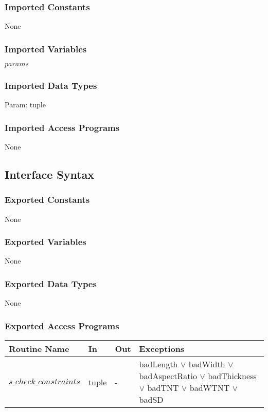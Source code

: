 \documentclass[12pt]{article}
\begin{document}
\subsubsection{Imported Constants}

None

\subsubsection{Imported Variables}

$params$

\subsubsection{Imported Data Types}

Param: tuple

\subsubsection{Imported Access Programs}

None

\subsection{Interface Syntax}

\subsubsection{Exported Constants}

None

\subsubsection{Exported Variables}

None

\subsubsection{Exported Data Types}

None

\subsubsection{Exported Access Programs}

\begin{center}
\begin{tabular}{l l l p{}}\hline 
\textbf{Routine Name} & \textbf{In} &\textbf{Out} & \textbf{Exceptions} \\ \hline 
$s\_check\_constraints$ & tuple & - & badLength $\vee$ badWidth $\vee$ badAspectRatio 
$\vee$ badThickness $\vee$ badTNT $\vee$ badWTNT $\vee$ badSD \\ \hline
\end{tabular}
\end{center}
\end{document}
